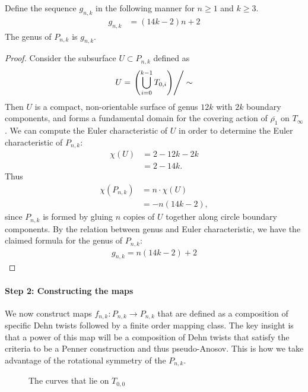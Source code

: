 \begin{lem}
\label{lem:genera}
Define the sequence $g_{n,k}$ in the following manner for $n \geq 1$ and $k \geq 3$.
\begin{align*}
    g_{n,k} &= (14k - 2)n + 2
\end{align*}
    The genus of $P_{n,k}$ is $g_{n,k}$.
\end{lem}
\begin{proof}
  Consider the subsurface $U \subset P_{n,k}$ defined as
  \begin{align*}
    U = \left. \left( \bigcup_{i =0}^{k-1} T_{0,i} \right)\right/\sim
  \end{align*}
  Then $U$ is a compact, non-orientable surface of
  genus $12k$ with $2k$ boundary components, and forms a fundamental domain for the covering action of
  $\overline{\rho_1}$ on $T_\infty$. We can compute the Euler characteristic of $U$ in order to determine the Euler characteristic of $P_{n,k}$:
  \begin{align*}
    \chi(U) &= 2 - 12k - 2k \\
            &= 2 - 14k.
  \end{align*}
  Thus
  \begin{align*}
    \chi(P_{n,k}) &= n \cdot \chi(U)\\
                  &= -n(14k - 2),
  \end{align*}
  since $P_{n,k}$ is formed by gluing $n$ copies of $U$ together along circle boundary components. By the
  relation between genus and Euler characteristic, we have the claimed formula for the genus of $P_{n,k}:$
  \begin{align*}
    g_{n,k} = n(14k-2) + 2
  \end{align*}
\end{proof}

\paragraph{Step 2: Constructing the maps}

We now construct maps $f_{n,k}: P_{n,k} \to P_{n,k}$ that are defined as a composition of specific Dehn twists
followed by a finite order mapping class. The key insight is that a power of this map will be a composition of
Dehn twists that satisfy the criteria to be a Penner construction and thus pseudo-Anosov. This is how we take
advantage of the rotational symmetry of the $P_{n,k}$.

\begin{figure}[h]
    \centering
    \caption{The curves that lie on $T_{0,0}$}
    \label{fig:curves}
\end{figure}

